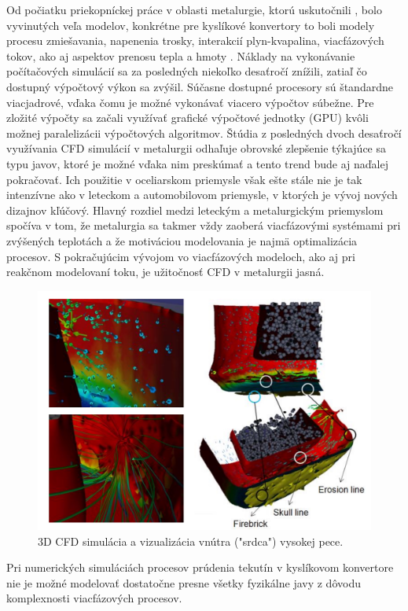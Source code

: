 \documentclass[]{tukediphc}
\begin{document}
Od počiatku priekopníckej práce v oblasti metalurgie, ktorú uskutočnili \cite{dilawari1977}, bolo vyvinutých veľa modelov, konkrétne pre kyslíkové konvertory to boli modely procesu zmiešavania, napenenia trosky, interakcií plyn-kvapalina, viacfázových tokov, ako aj aspektov prenosu tepla a hmoty \citep{chattopadhyay2010}. Náklady na vykonávanie počítačových simulácií sa za posledných niekoľko desaťročí znížili, zatiaľ čo dostupný výpočtový výkon sa zvýšil. Súčasne dostupné procesory sú štandardne viacjadrové, vďaka čomu je možné vykonávať viacero výpočtov súbežne. Pre zložité výpočty sa začali využívať grafické výpočtové jednotky (GPU) kvôli možnej paralelizácii výpočtových algoritmov. Štúdia z posledných dvoch desaťročí \citep{Ersson2018} využívania CFD simulácií v metalurgii odhaľuje obrovské zlepšenie týkajúce sa typu javov, ktoré je možné vďaka  nim preskúmať a tento trend bude  aj naďalej pokračovať. Ich použitie v oceliarskom priemysle však ešte stále nie je tak intenzívne ako v leteckom a automobilovom priemysle, v ktorých je vývoj nových dizajnov kľúčový. Hlavný rozdiel medzi leteckým a metalurgickým priemyslom spočíva v tom, že metalurgia sa takmer vždy zaoberá viacfázovými systémami pri zvýšených teplotách a že motiváciou modelovania je najmä optimalizácia procesov. S pokračujúcim vývojom vo viacfázových modeloch, ako aj pri reakčnom modelovaní toku, je užitočnosť CFD v metalurgii jasná.

\begin{figure}[!ht]
	\centering
	\includegraphics[width=.8\textwidth,angle=0]{figures/blast-furnace-erosion-vr.jpg}
	\caption{3D CFD simulácia a vizualizácia vnútra ("srdca") vysokej pece.}
\end{figure}

Pri numerických simuláciách procesov prúdenia tekutín v kyslíkovom konvertore nie je možné modelovať dostatočne presne všetky fyzikálne javy z dôvodu komplexnosti viacfázových procesov. 
\end{document}
